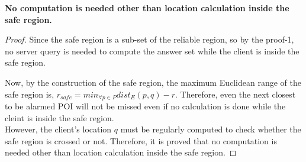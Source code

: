 \textbf{No computation is needed other than location calculation inside the safe region.}
\begin{proof}
Since the safe region is a sub-set of the reliable region, so by the proof-1, no server query is needed to compute the answer set while the client is inside the safe region.

Now, by the construction of the safe region, the maximum Euclidean range of the safe region is, $r_{safe} = min_{\forall p \in P} dist_E(p, q) - r$. Therefore, even the next closest to be alarmed POI will not be missed even if no calculation is done while the cleint is inside the safe region.\\
However, the client's location $q$ must be regularly computed to check whether the safe region is crossed or not. Therefore, it is proved that no computation is needed other than location calculation inside the safe region.
\end{proof} 